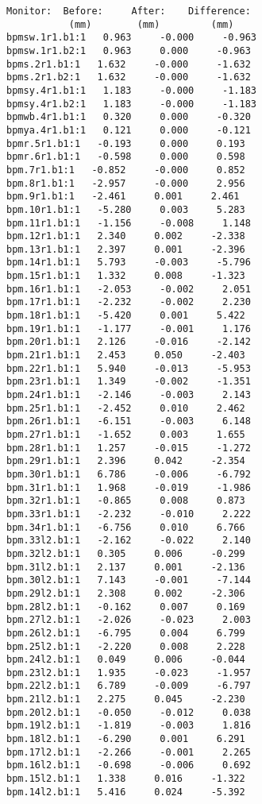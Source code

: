 \begin{verbatim}
Monitor:  Before:     After:    Difference:
           (mm)        (mm)         (mm)   
bpmsw.1r1.b1:1   0.963     -0.000     -0.963
bpmsw.1r1.b2:1   0.963     0.000     -0.963
bpms.2r1.b1:1   1.632     -0.000     -1.632
bpms.2r1.b2:1   1.632     -0.000     -1.632
bpmsy.4r1.b1:1   1.183     -0.000     -1.183
bpmsy.4r1.b2:1   1.183     -0.000     -1.183
bpmwb.4r1.b1:1   0.320     0.000     -0.320
bpmya.4r1.b1:1   0.121     0.000     -0.121
bpmr.5r1.b1:1   -0.193     0.000     0.193
bpmr.6r1.b1:1   -0.598     0.000     0.598
bpm.7r1.b1:1   -0.852     -0.000     0.852
bpm.8r1.b1:1   -2.957     -0.000     2.956
bpm.9r1.b1:1   -2.461     0.001     2.461
bpm.10r1.b1:1   -5.280     0.003     5.283
bpm.11r1.b1:1   -1.156     -0.008     1.148
bpm.12r1.b1:1   2.340     0.002     -2.338
bpm.13r1.b1:1   2.397     0.001     -2.396
bpm.14r1.b1:1   5.793     -0.003     -5.796
bpm.15r1.b1:1   1.332     0.008     -1.323
bpm.16r1.b1:1   -2.053     -0.002     2.051
bpm.17r1.b1:1   -2.232     -0.002     2.230
bpm.18r1.b1:1   -5.420     0.001     5.422
bpm.19r1.b1:1   -1.177     -0.001     1.176
bpm.20r1.b1:1   2.126     -0.016     -2.142
bpm.21r1.b1:1   2.453     0.050     -2.403
bpm.22r1.b1:1   5.940     -0.013     -5.953
bpm.23r1.b1:1   1.349     -0.002     -1.351
bpm.24r1.b1:1   -2.146     -0.003     2.143
bpm.25r1.b1:1   -2.452     0.010     2.462
bpm.26r1.b1:1   -6.151     -0.003     6.148
bpm.27r1.b1:1   -1.652     0.003     1.655
bpm.28r1.b1:1   1.257     -0.015     -1.272
bpm.29r1.b1:1   2.396     0.042     -2.354
bpm.30r1.b1:1   6.786     -0.006     -6.792
bpm.31r1.b1:1   1.968     -0.019     -1.986
bpm.32r1.b1:1   -0.865     0.008     0.873
bpm.33r1.b1:1   -2.232     -0.010     2.222
bpm.34r1.b1:1   -6.756     0.010     6.766
bpm.33l2.b1:1   -2.162     -0.022     2.140
bpm.32l2.b1:1   0.305     0.006     -0.299
bpm.31l2.b1:1   2.137     0.001     -2.136
bpm.30l2.b1:1   7.143     -0.001     -7.144
bpm.29l2.b1:1   2.308     0.002     -2.306
bpm.28l2.b1:1   -0.162     0.007     0.169
bpm.27l2.b1:1   -2.026     -0.023     2.003
bpm.26l2.b1:1   -6.795     0.004     6.799
bpm.25l2.b1:1   -2.220     0.008     2.228
bpm.24l2.b1:1   0.049     0.006     -0.044
bpm.23l2.b1:1   1.935     -0.023     -1.957
bpm.22l2.b1:1   6.789     -0.009     -6.797
bpm.21l2.b1:1   2.275     0.045     -2.230
bpm.20l2.b1:1   -0.050     -0.012     0.038
bpm.19l2.b1:1   -1.819     -0.003     1.816
bpm.18l2.b1:1   -6.290     0.001     6.291
bpm.17l2.b1:1   -2.266     -0.001     2.265
bpm.16l2.b1:1   -0.698     -0.006     0.692
bpm.15l2.b1:1   1.338     0.016     -1.322
bpm.14l2.b1:1   5.416     0.024     -5.392

\end{verbatim}
